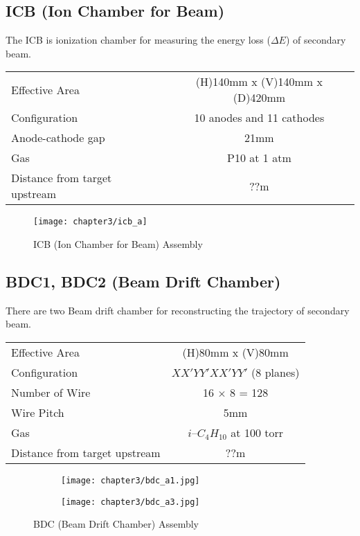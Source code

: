 \subsection{ICB (Ion Chamber for Beam)}
The ICB is ionization chamber for measuring the energy loss ($\Delta E$) of secondary beam.
\begin{table}[h]
    \centering
    \begin{tabular}{l|c}
        \hline
        Effective Area & (H)140mm x (V)140mm x (D)420mm\\
        Configuration & 10 anodes and 11 cathodes \\
        Anode-cathode gap & 21mm \\
        Gas & P10 at 1 atm\\
        Distance from target upstream & ??m \\
        \hline
    \end{tabular}
\end{table}

\begin{figure}[t]
    \centering
    \texttt{[image: chapter3/icb\_a]}
    \caption{ICB (Ion Chamber for Beam) Assembly}
\end{figure}

\subsection{BDC1, BDC2 (Beam Drift Chamber)}
There are two Beam drift chamber for reconstructing the trajectory of secondary beam. 

\begin{table}[h]
    \centering
    \begin{tabular}{l|c}
        \hline
        Effective Area & (H)80mm x (V)80mm\\
        Configuration & $XX'YY'XX'YY'$ (8 planes)\\
        Number of Wire & 16 $\times$ 8 = 128 \\
        Wire Pitch & 5mm \\
        Gas & $i$--${C}_{4} {H}_{10}$ at 100 torr\\
        Distance from target upstream & ??m \\
        \hline
    \end{tabular}
\end{table}

\begin{figure}[h]
    \centering
    \begin{subfigure}{\textwidth}
        \texttt{[image: chapter3/bdc\_a1.jpg]}    
    \end{subfigure}
    \begin{subfigure}{\textwidth}
        \texttt{[image: chapter3/bdc\_a3.jpg]}
    \end{subfigure}
    \caption{BDC (Beam Drift Chamber) Assembly}
\end{figure}

